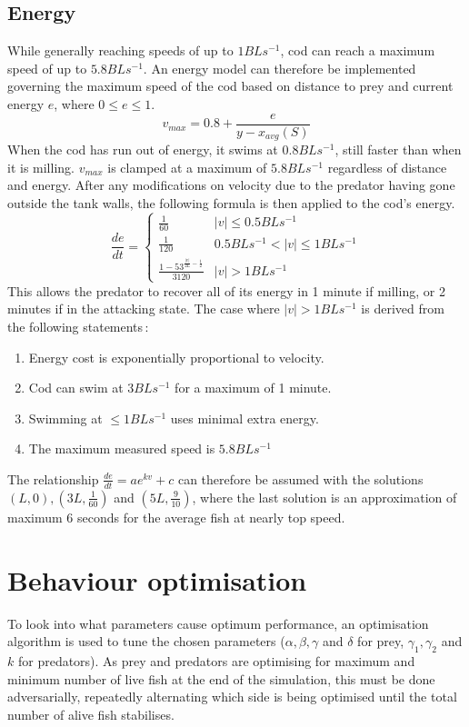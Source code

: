 \documentclass[12pt]{article}
\begin{document}
\subsection{Energy}
While generally reaching speeds of up to $1BLs^{-1}$, cod can reach a maximum speed\supercite{Rillahan2008} of up to $5.8BLs^{-1}$. An energy model can therefore be implemented governing the maximum speed of the cod based on distance to prey and current energy $e$, where $0\le e \le 1$.
\begin{equation}
    v_{max} = 0.8+\frac{e}{y-x_{avg}(S)}
\end{equation}
When the cod has run out of energy, it swims at $0.8BLs^{-1}$, still faster than when it is milling. $v_{max}$ is clamped at a maximum of $5.8BLs^{-1}$ regardless of distance and energy.
After any modifications on velocity due to the predator having gone outside the tank walls, the following formula is then applied to the cod's energy.
\begin{equation}
    \frac{de}{dt} = \begin{cases}
    \frac{1}{60}&|v|\le0.5BLs^{-1}\\
    \frac{1}{120}&0.5BLs^{-1}<|v|\le1BLs^{-1}\\
    \frac{1-53^{\frac{|v|}{2L}-\frac{1}{2}}}{3120}&|v|>1BLs^{-1}
    \end{cases}
\end{equation}
This allows the predator to recover all of its energy in 1 minute if milling, or 2 minutes if in the attacking state. The case where $|v|>1BLs^{-1}$ is derived from the following statements\supercite{Rillahan2008}\,\supercite{He1991}:
\begin{enumerate}
    \item Energy cost is exponentially proportional to velocity.
    \item Cod can swim at $3BLs^{-1}$ for a maximum of 1 minute.
    \item Swimming at $\le 1BLs^{-1}$ uses minimal extra energy.
    \item The maximum measured speed is $5.8BLs^{-1}$
\end{enumerate}
The relationship $\frac{de}{dt}=ae^{kv}+c$ can therefore be assumed with the solutions $\left(L, 0\right),\left(3L,\frac{1}{60}\right)$ and $\left(5L,\frac{9}{10}\right)$, where the last solution is an approximation of maximum 6 seconds for the average fish at nearly top speed.
\section{Behaviour optimisation}
To look into what parameters cause optimum performance, an optimisation algorithm is used to tune the chosen parameters ($\alpha, \beta, \gamma$ and $\delta$ for prey, $\gamma_1, \gamma_2$ and $k$ for predators). As prey and predators are optimising for maximum and minimum number of live fish at the end of the simulation, this must be done adversarially, repeatedly alternating which side is being optimised until the total number of alive fish stabilises. 
\end{document}
